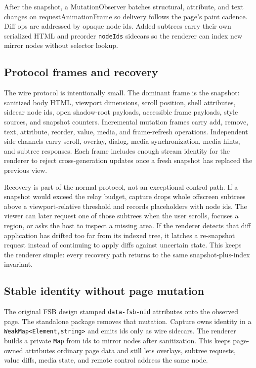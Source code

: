 \documentclass[conference]{IEEEtran}
\newcommand{\code}[1]{\texttt{\small #1}}
\begin{document}
After the snapshot, a MutationObserver batches structural, attribute, and text
changes on requestAnimationFrame so delivery follows the page's paint cadence.
Diff ops are addressed by opaque node ids. Added subtrees carry their own
serialized HTML and preorder \code{nodeIds} sidecars so the renderer can index
new mirror nodes without selector lookup.

\subsection{Protocol frames and recovery}

The wire protocol is intentionally small. The dominant frame is the snapshot:
sanitized body HTML, viewport dimensions, scroll position, shell attributes,
sidecar node ids, open shadow-root payloads, accessible frame payloads, style
sources, and snapshot counters. Incremental mutation frames carry add, remove,
text, attribute, reorder, value, media, and frame-refresh operations. Independent
side channels carry scroll, overlay, dialog, media synchronization, media hints,
and subtree responses. Each frame includes enough stream identity for the
renderer to reject cross-generation updates once a fresh snapshot has replaced
the previous view.

Recovery is part of the normal protocol, not an exceptional control path. If a
snapshot would exceed the relay budget, capture drops whole offscreen subtrees
above a viewport-relative threshold and records placeholders with node ids. The
viewer can later request one of those subtrees when the user scrolls, focuses a
region, or asks the host to inspect a missing area. If the renderer detects that
diff application has drifted too far from its indexed tree, it latches a
re-snapshot request instead of continuing to apply diffs against uncertain
state. This keeps the renderer simple: every recovery path returns to the same
snapshot-plus-index invariant.

\subsection{Stable identity without page mutation}

The original FSB design stamped \code{data-fsb-nid} attributes onto the observed
page. The standalone package removes that mutation. Capture owns identity in a
\code{WeakMap<Element,string>} and emits ids only as wire sidecars. The renderer
builds a private \code{Map} from ids to mirror nodes after sanitization. This
keeps page-owned attributes ordinary page data and still lets overlays, subtree
requests, value diffs, media state, and remote control address the same node.
\end{document}
